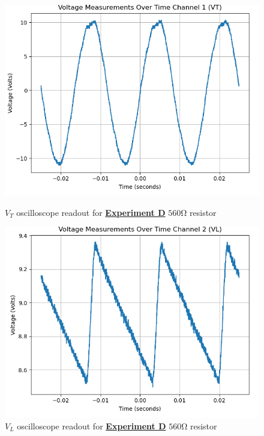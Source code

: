 \documentclass[
	letterpaper
	12pt
]{template}
\newcommand{\bref}[2]{\textbf{\hyperref[#1]{#2}}}
\begin{document}
\begin{figure}[H]\label{data::D2}
	\centering
	\begin{minipage}[c]{0.45\textwidth}
		\centering
		\includegraphics[width=\textwidth]{figures/D/2--ch1.png}
	    \caption{$V_{T}$ oscilloscope readout for \bref{exp::D}{Experiment D} $560\unit{\ohm}$ resistor}
	\end{minipage}
	\hfill
	\begin{minipage}[c]{0.45\textwidth}
		\centering
		\includegraphics[width=\textwidth]{figures/D/2--ch2.png}
	    \caption{$V_{L}$ oscilloscope readout for \bref{exp::D}{Experiment D} $560\unit{\ohm}$ resistor}
	\end{minipage}
\end{figure}
\end{document}
